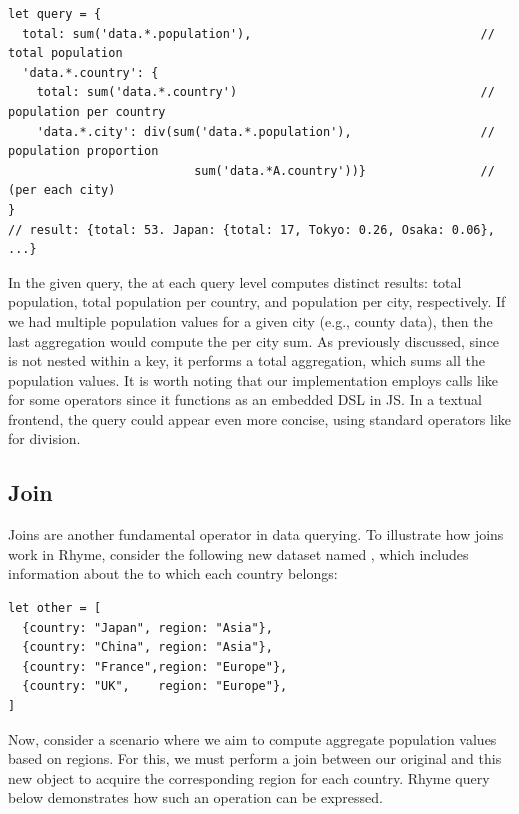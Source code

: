 \documentclass[runningheads]{llncs}
\newcommand{\lang}{Rhyme}
\begin{document}
\begin{lstlisting}[style=JavaScript, columns=flexible, numbers=none]
let query = { 
  total: sum('data.*.population'),                                // total population
  'data.*.country': {
    total: sum('data.*.country')                                  // population per country
    'data.*.city': div(sum('data.*.population'),                  // population proportion
                          sum('data.*A.country'))}                // (per each city)
}
// result: {total: 53. Japan: {total: 17, Tokyo: 0.26, Osaka: 0.06}, ...}
\end{lstlisting}

In the given query, the  at each query level computes
distinct results: total population, total population per country, and population per city,
respectively. 
If we had multiple population values for a given city (e.g., county data), then the
last aggregation would compute the per city sum.
As previously discussed, since  is not nested within a
 key, it performs a total aggregation, which sums all the population values.
It is worth noting that our implementation employs calls like  for some operators
since it functions as an embedded DSL in JS.
In a textual frontend, the query could appear even more concise, using standard operators 
like \inline{/} for division.

\vspace{-3mm}
\subsection{Join}
\vspace{-2mm}
Joins are another fundamental operator in data querying.
To illustrate how joins work in \lang{}, consider the following
new dataset named , which includes information about the
 to which each country belongs:

\begin{lstlisting}[style=JavaScript, columns=flexible]
let other = [
  {country: "Japan", region: "Asia"},
  {country: "China", region: "Asia"},
  {country: "France",region: "Europe"},
  {country: "UK",    region: "Europe"},
]
\end{lstlisting}
\vspace{-2mm}

Now, consider a scenario where we aim to compute aggregate population
values based on regions.
For this, we must perform a join between our original
 and this new  object to acquire the
corresponding region for each country.
\lang{} query below demonstrates how such an operation can be
expressed.
\end{document}
